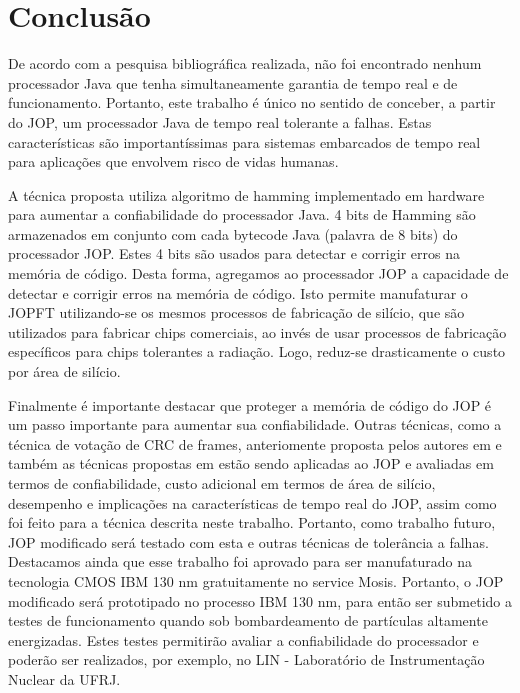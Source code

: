 \documentclass[10pt,twocolumn]{article}
\begin{document}
\section{Conclusão}
	De acordo com a pesquisa bibliográfica realizada, não foi encontrado nenhum processador Java que tenha simultaneamente garantia de tempo real e de funcionamento. Portanto, este trabalho é único no sentido de conceber, a partir do JOP, um processador Java de tempo real tolerante a falhas. Estas características são importantíssimas para sistemas embarcados de tempo real para aplicações que envolvem risco de vidas humanas.

	A técnica proposta utiliza algoritmo de hamming implementado em hardware para aumentar a confiabilidade do processador Java. 4 bits de Hamming são armazenados em conjunto com cada bytecode Java (palavra de 8 bits) do processador JOP.  Estes 4 bits são usados para detectar e corrigir erros na memória de código. Desta forma, agregamos ao processador JOP a capacidade de detectar e corrigir erros na memória de código. Isto permite manufaturar o JOPFT utilizando-se os mesmos processos de fabricação de silício, que são utilizados para fabricar chips comerciais, ao invés de usar processos de fabricação específicos para chips tolerantes a radiação. Logo, reduz-se drasticamente o custo por área de silício.


	Finalmente é importante destacar que proteger a memória de código do JOP é um passo importante para aumentar sua confiabilidade. Outras técnicas, como a técnica de votação de CRC de frames,  anteriomente proposta pelos autores em \cite{CRCFpga} e também as técnicas propostas em \cite{leon3ft} estão sendo aplicadas ao JOP e avaliadas em termos de confiabilidade, custo adicional em termos de área de silício, desempenho e implicações na características de tempo real do JOP, assim como foi feito para a técnica descrita neste trabalho. Portanto, como trabalho futuro, JOP modificado será testado com esta e outras técnicas de tolerância a falhas.  Destacamos ainda que esse trabalho foi aprovado para ser manufaturado na tecnologia CMOS IBM 130 nm gratuitamente no service Mosis. Portanto, o JOP modificado será prototipado no processo IBM 130 nm, para então ser submetido a testes de funcionamento quando sob bombardeamento de partículas altamente energizadas. Estes testes permitirão avaliar a confiabilidade do processador e poderão ser realizados, por exemplo, no LIN - Laboratório de Instrumentação Nuclear da UFRJ.
\end{document}
